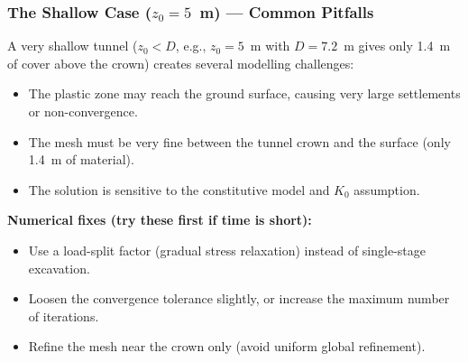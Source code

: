 \documentclass[a4paper,12pt]{article}
\begin{document}
\subsubsection{The Shallow Case ($z_0 = 5$~m) --- Common Pitfalls}

\begin{warnbox}
A very shallow tunnel ($z_0 < D$, e.g., $z_0 = 5$~m with $D = 7.2$~m gives only 1.4~m of cover above the crown) creates several modelling challenges:
\begin{itemize}[nosep]
    \item The plastic zone may reach the ground surface, causing very large settlements or non-convergence.
    \item The mesh must be very fine between the tunnel crown and the surface (only 1.4~m of material).
    \item The solution is sensitive to the constitutive model and $K_0$ assumption.
\end{itemize}
\vspace{0.5em}

\textbf{Numerical fixes (try these first if time is short):}
\begin{itemize}[nosep]
    \item Use a load-split factor (gradual stress relaxation) instead of single-stage excavation.
    \item Loosen the convergence tolerance slightly, or increase the maximum number of iterations.
    \item Refine the mesh near the crown only (avoid uniform global refinement).
\end{itemize}
\vspace{0.5em}


\end{warnbox}
\end{document}
